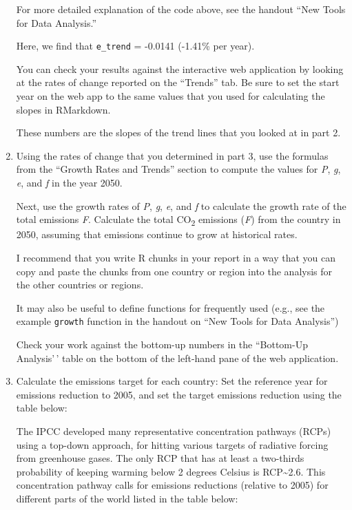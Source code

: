 \documentclass[
]{article}
\begin{document}
\begin{enumerate}
  For more detailed explanation of the code above, see the handout ``New
  Tools for Data Analysis.''

  Here, we find that \texttt{e\_trend} = -0.0141 (-1.41\% per year).

  You can check your results against the interactive web application by
  looking at the rates of change reported on the ``Trends'' tab. Be sure
  to set the start year on the web app to the same values that you used
  for calculating the slopes in RMarkdown.

  These numbers are the slopes of the trend lines that you looked at in
  part 2.
\item
  Using the rates of change that you determined in part 3, use the
  formulas from the ``Growth Rates and Trends'' section to compute the
  values for \emph{P}, \emph{g}, \emph{e}, and \emph{f} in the year
  2050.

  Next, use the growth rates of \emph{P}, \emph{g}, \emph{e}, and
  \emph{f} to calculate the growth rate of the total emissions \emph{F}.
  Calculate the total CO\textsubscript{2} emissions (\emph{F}) from the
  country in 2050, assuming that emissions continue to grow at
  historical rates.

  I recommend that you write R chunks in your report in a way that you
  can copy and paste the chunks from one country or region into the
  analysis for the other countries or regions.

  It may also be useful to define functions for frequently used (e.g.,
  see the example \texttt{growth} function in the handout on ``New Tools
  for Data Analysis'')

  Check your work against the bottom-up numbers in the ``Bottom-Up
  Analysis'\,' table on the bottom of the left-hand pane of the web
  application.
\item
  Calculate the emissions target for each country: Set the reference
  year for emissions reduction to 2005, and set the target emissions
  reduction using the table below:

  The IPCC developed many representative concentration pathways (RCPs)
  using a top-down approach, for hitting various targets of radiative
  forcing from greenhouse gases. The only RCP that has at least a
  two-thirds probability of keeping warming below 2 degrees Celsius is
  RCP\textasciitilde2.6. This concentration pathway calls for emissions
  reductions (relative to 2005) for different parts of the world listed
  in the table below:


\end{enumerate}
\end{document}
